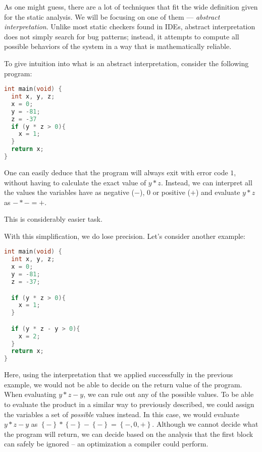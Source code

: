 \documentclass[..thesis.tex]{subfiles}
\begin{document}
As one might guess, there are a lot of techniques that fit the wide definition given for the static analysis. We will be focusing on one of them --- \textit{abstract interpretation}. Unlike most static checkers found in IDEs, abstract interpretation does not simply search for bug patterns; instead, it attempts to compute all possible behaviors of the system in a way that is mathematically reliable.



To give intuition into what is an abstract interpretation, consider the following program:

\begin{lstlisting}[language=C,style=def]
int main(void) {
  int x, y, z;
  x = 0;
  y = -81;
  z = -37
  if (y * z > 0){
    x = 1;
  }
  return x;
}
\end{lstlisting}

One can easily deduce that the program will always exit with error code $1$, without having to calculate the exact value of  $y*z$.
Instead, we can interpret all the values the variables have as negative ($-$), $0$ or positive ($+$) and evaluate $y * z$ as $-*- = +$.

This is considerably easier task.

With this simplification, we do lose precision. Let's consider another example:

\begin{lstlisting}[language=C,style=def]
int main(void) {
  int x, y, z;
  x = 0;
  y = -81;
  z = -37;

  if (y * z > 0){
    x = 1;
  }

  if (y * z - y > 0){
    x = 2;
  }
  return x;
}
\end{lstlisting}

Here, using the interpretation that we applied successfully in the previous example, we would not be able to decide on the return value of the program. 
When evaluating $y * z - y $, we can rule out any of the possible values. To be able to evaluate the product in a similar way to previously described,
we could assign the variables a set of \textit{possible} values instead. In this case, we would evaluate $y * z - y $ as $\left\lbrace - \right\rbrace * \left\lbrace
- \right\rbrace - \left\lbrace - \right\rbrace = \left\lbrace -,0,+ \right\rbrace$. Although we cannot decide what the program will return,
we can decide based on the analysis that the first  block can safely be ignored -- an optimization a compiler could perform.
\end{document}
